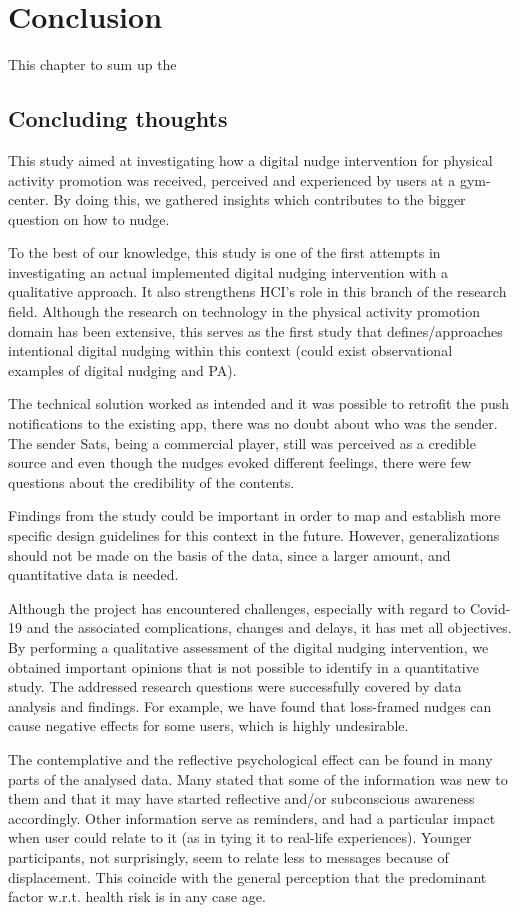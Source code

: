 \chapter{Conclusion} 
This chapter to sum up the 

\section{Concluding thoughts}
This study aimed at investigating how a digital nudge intervention for physical activity promotion was received, perceived and experienced by users at a gym-center. By doing this, we gathered insights which contributes to the bigger question on how to nudge.

To the best of our knowledge, this study is one of the first attempts in investigating an actual implemented digital nudging intervention with a qualitative approach. It also strengthens HCI's role in this branch of the research field. Although the research on technology in the physical activity promotion domain has been extensive, this serves as the first study that defines/approaches intentional digital nudging within this context (could exist observational examples of digital nudging and PA). 

The technical solution worked as intended and it was possible to retrofit the push notifications to the existing app, there was no doubt about who was the sender. The sender Sats, being a commercial player, still was perceived as a credible source and even though the nudges evoked different feelings, there were few questions about the credibility of the contents.

Findings from the study could be important in order to map and establish more specific design guidelines for this context in the future. However, generalizations should not be made on the basis of the data, since a larger amount, and quantitative data is needed.

Although the project has encountered challenges, especially with regard to Covid-19 and the associated complications, changes and delays, it has met all objectives. By performing a qualitative assessment of the digital nudging intervention, we obtained important opinions that is not possible to identify in a quantitative study. The addressed research questions were successfully covered by data analysis and findings. For example, we have found that loss-framed nudges can cause negative effects for some users, which is highly undesirable. 

The contemplative and the reflective psychological effect can be found in many parts of the analysed data. Many stated that some of the information was new to them and that it may have started reflective and/or subconscious awareness accordingly. Other information serve as reminders, and had a particular impact when user could relate to it (as in tying it to real-life experiences). Younger participants, not surprisingly, seem to relate less to messages because of displacement. This coincide with the general perception that the predominant factor w.r.t. health risk is in any case age. 

